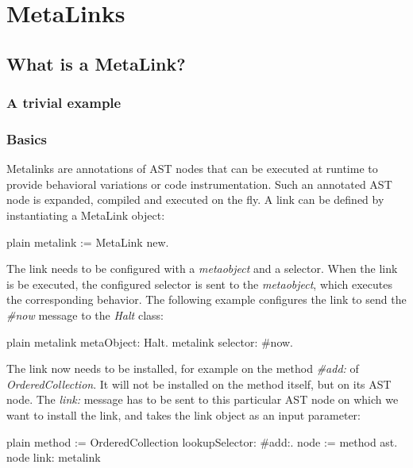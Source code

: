 \documentclass[10pt,twoside,english]{_support/latex/sbabook/sbabook}
\begin{document}
\frontmatter
\pagestyle{plain}

\tableofcontents*
\clearpage\listoffigures

\mainmatter

\chapter{MetaLinks}\section{What is a MetaLink?}\subsection{A trivial example}\subsection{Basics}
Metalinks are annotations of AST nodes that can be executed at runtime to provide behavioral variations or code instrumentation. Such an annotated AST node is expanded, compiled and executed on the fly. A link can be defined by instantiating a MetaLink object:

\begin{displaycode}{plain}
metalink := MetaLink new.
\end{displaycode}

The link needs to be configured with a \textit{metaobject} and a selector. When the link is be executed, the configured selector is sent to the \textit{metaobject}, which executes the corresponding behavior. The following example configures the link to send the \textit{\#now} message to the \textit{Halt} class:

\begin{displaycode}{plain}
metalink metaObject: Halt.
metalink selector: #now.
\end{displaycode}

The link now needs to be installed, for example on the method \textit{\#add:} of \textit{OrderedCollection}. It will not be installed on the method itself, but on its AST node. The \textit{link:} message has to be sent to this particular AST node on which we want to install the link, and takes the link object as an input parameter:

\begin{displaycode}{plain}
method := OrderedCollection lookupSelector: #add:.
node := method ast.
node link: metalink
\end{displaycode}
\end{document}
